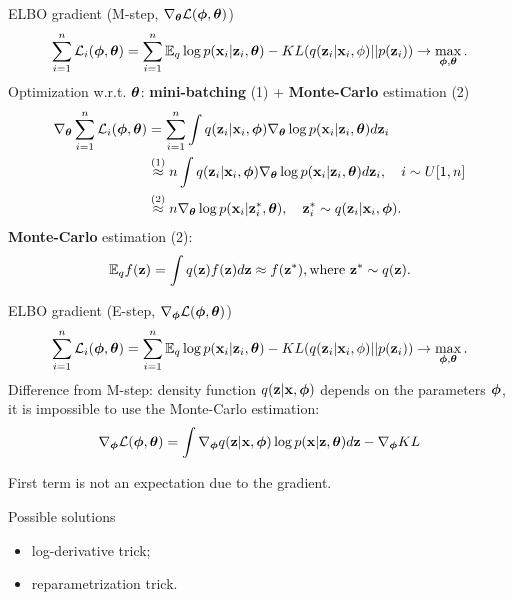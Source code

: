 \begin{frame}{ELBO gradient (M-step, $\nabla_{\boldsymbol{\theta}} \mathcal{L}(\boldsymbol{\phi}, \boldsymbol{\theta})$)}
	\vspace{-0.3cm}
	\[
		\sum_{i=1}^n \mathcal{L}_i (\boldsymbol{\phi}, \boldsymbol{\theta})  = \sum_{i=1}^n \mathbb{E}_{q} \log p(\mathbf{x}_i | \mathbf{z}_i, \boldsymbol{\theta}) - KL (q(\mathbf{z}_i| \mathbf{x}_i, \phi) || p(\mathbf{z}_i)) \rightarrow \max_{\boldsymbol{\phi}, \boldsymbol{\theta}}.
	\]
	Optimization w.r.t. $\boldsymbol{\theta}$: \textbf{mini-batching} (1) + \textbf{Monte-Carlo} estimation (2)
	\begin{align*}
		\nabla_{\boldsymbol{\theta}} \sum_{i=1}^n \mathcal{L}_i (\boldsymbol{\phi}, \boldsymbol{\theta})
		&= \sum_{i=1}^n \int q(\mathbf{z}_i|\mathbf{x}_i, \boldsymbol{\phi}) \nabla_{\boldsymbol{\theta}}\log p(\mathbf{x}_i|\mathbf{z}_i, \boldsymbol{\theta})  d \mathbf{z}_i \\
		&\mathrel{\stackrel{\rm (1)}\approx} n\int q(\mathbf{z}_i|\mathbf{x}_i, \boldsymbol{\phi}) \nabla_{\boldsymbol{\theta}}\log p(\mathbf{x}_i|\mathbf{z}_i, \boldsymbol{\theta}) d \mathbf{z}_i , \quad i \sim U[1, n] \\
		&\mathrel{\stackrel{\rm (2)}\approx}  n \nabla_{\boldsymbol{\theta}}\log p(\mathbf{x}_i|\mathbf{z}^*_i, \boldsymbol{\theta}), \quad \mathbf{z}^*_i \sim q(\mathbf{z}_i|\mathbf{x}_i, \boldsymbol{\phi}).
	\end{align*}
	\textbf{Monte-Carlo} estimation (2):
	\[
		\mathbb{E}_q f(\mathbf{z}) = \int q(\mathbf{z}) f(\mathbf{z}) d\mathbf{z} \approx f(\mathbf{z}^*), \text{where } \mathbf{z}^* \sim q(\mathbf{z}).
	\]
	\end{frame}
\begin{frame}{ELBO gradient (E-step, $\nabla_{\boldsymbol{\phi}} \mathcal{L}(\boldsymbol{\phi}, \boldsymbol{\theta})$)}
	\vspace{-0.3cm}
	\[
	\sum_{i=1}^n \mathcal{L}_i (\boldsymbol{\phi}, \boldsymbol{\theta})  = \sum_{i=1}^n \mathbb{E}_{q} \log p(\mathbf{x}_i | \mathbf{z}_i, \boldsymbol{\theta}) - KL (q(\mathbf{z}_i| \mathbf{x}_i, \phi) || p(\mathbf{z}_i)) \rightarrow \max_{\boldsymbol{\phi}, \boldsymbol{\theta}}.
	\]
	Difference from M-step: density function $q(\mathbf{z}| \mathbf{x}, \boldsymbol{\phi})$ depends on the parameters $\boldsymbol{\phi}$, it is impossible to use the Monte-Carlo estimation:
	\[
	\nabla_{\boldsymbol{\phi}} \mathcal{L} (\boldsymbol{\phi}, \boldsymbol{\theta}) = \int \nabla_{\boldsymbol{\phi}} q(\mathbf{z}| \mathbf{x}, \boldsymbol{\phi}) \log p(\mathbf{x} |\mathbf{z}, \boldsymbol{\theta}) d\mathbf{z} - \nabla_{\boldsymbol{\phi}} KL
	\]
	
	First term is not an expectation due to the gradient.
	
	\begin{block}{Possible solutions}
		\begin{itemize}
			\item log-derivative trick;
			\item reparametrization trick.
		\end{itemize}
	\end{block}
\end{frame}
